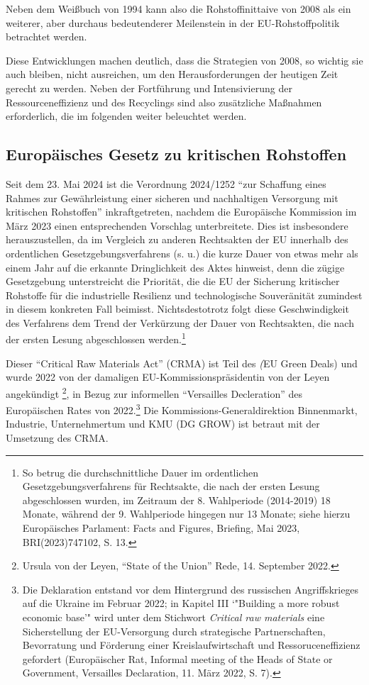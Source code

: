 \documentclass[12pt,a4paper,oneside]{book} %
\begin{document}
	Neben dem Weißbuch von 1994 kann also die Rohstoffinittaive von 2008 als ein weiterer, aber durchaus bedeutenderer Meilenstein in der EU-Rohstoffpolitik betrachtet werden.
	
	Diese Entwicklungen machen deutlich, dass die Strategien von 2008, so wichtig sie auch bleiben, nicht ausreichen, um den Herausforderungen der heutigen Zeit gerecht zu werden. Neben der Fortführung und Intensivierung der Ressourceneffizienz und des Recyclings sind also zusätzliche Maßnahmen erforderlich, die im folgenden weiter beleuchtet werden.
	
	\subsection{Europäisches Gesetz zu kritischen Rohstoffen}\label{EU-Verordnung}
	
	Seit dem 23. Mai 2024 ist die Verordnung 2024/1252 "`zur Schaffung eines Rahmes zur Gewährleistung einer sicheren und nachhaltigen Versorgung mit kritischen Rohstoffen"' inkraftgetreten, nachdem die Europäische Kommission im März 2023 einen entsprechenden Vorschlag unterbreitete. Dies ist insbesondere herauszustellen, da im Vergleich zu anderen Rechtsakten der EU innerhalb des ordentlichen Gesetzgebungsverfahrens (s. u.) die kurze Dauer von etwas mehr als einem Jahr auf die erkannte Dringlichkeit des Aktes hinweist, denn die zügige Gesetzgebung unterstreicht die Priorität, die die EU der Sicherung kritischer Rohstoffe für die industrielle Resilienz und technologische Souveränität zumindest in diesem konkreten Fall beimisst. Nichtsdestotrotz folgt diese Geschwindigkeit des Verfahrens dem Trend der Verkürzung der Dauer von Rechtsakten, die nach der ersten Lesung abgeschlossen werden.\footnote{So betrug die durchschnittliche Dauer im ordentlichen Gesetzgebungsverfahrens für Rechtsakte, die nach der ersten Lesung abgeschlossen wurden, im Zeitraum der 8. Wahlperiode (2014-2019) 18 Monate, während der 9. Wahlperiode hingegen nur 13 Monate; siehe hierzu Europäisches Parlament: Facts and Figures, Briefing, Mai 2023, BRI(2023)747102, S. 13.} 
	
	
	Dieser "`Critical Raw Materials Act"' (CRMA) ist Teil des \textit(EU Green Deals) und wurde 2022 von der damaligen EU-Kommissionspräsidentin von der Leyen angekündigt \footnote{Ursula von der Leyen, "`State of the Union"' Rede, 14. September 2022.}, in Bezug zur informellen "`Versailles Decleration"' des Europäischen Rates von 2022.\footnote{Die Deklaration entstand vor dem Hintergrund des russischen Angriffskrieges auf die Ukraine im Februar 2022; in Kapitel III `"Building a more robust economic base'" wird unter dem Stichwort \textit{Critical raw materials} eine Sicherstellung der EU-Versorgung durch strategische Partnerschaften, Bevorratung und Förderung einer Kreislaufwirtschaft und Ressoruceneffizienz gefordert (Europäischer Rat, Informal meeting of the Heads of State or Government, Versailles Declaration, 11. März 2022, S. 7).} Die Kommissions-Generaldirektion Binnenmarkt, Industrie, Unternehmertum und KMU (DG GROW) ist betraut mit der Umsetzung des CRMA.
	
\end{document}
